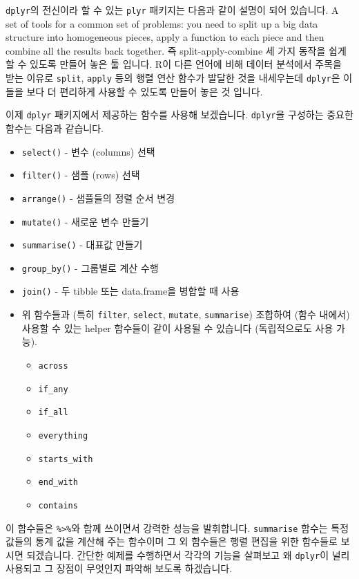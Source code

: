 \documentclass[
  a4paper,
]{book}
\providecommand{\tightlist}{%
  \setlength{\itemsep}{0pt}\setlength{\parskip}{0pt}}\usepackage{longtable,booktabs,array}
\begin{document}
\texttt{dplyr}의 전신이라 할 수 있는 \texttt{plyr} 패키지는 다음과 같이
설명이 되어 있습니다. A set of tools for a common set of problems: you
need to split up a big data structure into homogeneous pieces, apply a
function to each piece and then combine all the results back together.
즉 split-apply-combine 세 가지 동작을 쉽게 할 수 있도록 만들어 놓은 툴
입니다. R이 다른 언어에 비해 데이터 분석에서 주목을 받는 이유로
\texttt{split}, \texttt{apply} 등의 행렬 연산 함수가 발달한 것을
내세우는데 \texttt{dplyr}은 이들을 보다 더 편리하게 사용할 수 있도록
만들어 놓은 것 입니다.

이제 \texttt{dplyr} 패키지에서 제공하는 함수를 사용해 보겠습니다.
\texttt{dplyr}을 구성하는 중요한 함수는 다음과 같습니다.

\begin{itemize}
\item
  \texttt{select()} - 변수 (columns) 선택
\item
  \texttt{filter()} - 샘플 (rows) 선택
\item
  \texttt{arrange()} - 샘플들의 정렬 순서 변경
\item
  \texttt{mutate()} - 새로운 변수 만들기
\item
  \texttt{summarise()} - 대표값 만들기
\item
  \texttt{group\_by()} - 그룹별로 계산 수행
\item
  \texttt{join()} - 두 tibble 또는 data.frame을 병합할 때 사용
\item
  위 함수들과 (특히 \texttt{filter}, \texttt{select}, \texttt{mutate},
  \texttt{summarise}) 조합하여 (함수 내에서) 사용할 수 있는 helper
  함수들이 같이 사용될 수 있습니다 (독립적으로도 사용 가능).

  \begin{itemize}
  \tightlist
  \item
    \texttt{across}
  \item
    \texttt{if\_any}
  \item
    \texttt{if\_all}
  \item
    \texttt{everything}
  \item
    \texttt{starts\_with}
  \item
    \texttt{end\_with}
  \item
    \texttt{contains}
  \end{itemize}
\end{itemize}

이 함수들은 \texttt{\%\textgreater{}\%}와 함께 쓰이면서 강력한 성능을
발휘합니다. \texttt{summarise} 함수는 특정 값들의 통계 값을 계산해 주는
함수이며 그 외 함수들은 행렬 편집을 위한 함수들로 보시면 되겠습니다.
간단한 예제를 수행하면서 각각의 기능을 살펴보고 왜 \texttt{dplyr}이 널리
사용되고 그 장점이 무엇인지 파악해 보도록 하겠습니다.
\end{document}
